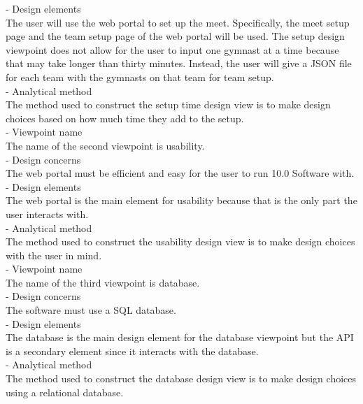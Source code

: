 \documentclass[letterpaper,10pt,draftclsnofoot,onecolumn,]{article}
\begin{document}
- Design elements\\
The user will use the web portal to set up the meet. Specifically, the meet setup page and the team setup page of the web portal will be used. The setup design viewpoint does not allow for the user to input one gymnast at a time because that may take longer than thirty minutes. Instead, the user will give a JSON file for each team with the gymnasts on that team for team setup.\\

- Analytical method\\
The method used to construct the setup time design view is to make design choices based on how much time they add to the setup.\\

- Viewpoint name\\
The name of the second viewpoint is usability.\\

- Design concerns\\
The web portal must be efficient and easy for the user to run 10.0 Software with.\\

- Design elements\\
The web portal is the main element for usability because that is the only part the user interacts with.\\

- Analytical method\\
The method used to construct the usability design view is to make design choices with the user in mind.\\

- Viewpoint name\\
The name of the third viewpoint is database.\\

- Design concerns\\
The software must use a SQL database.\\

- Design elements\\
The database is the main design element for the database viewpoint but the API is a secondary element since it interacts with the database.\\

- Analytical method\\
The method used to construct the database design view is to make design choices using a relational database.
\end{document}
